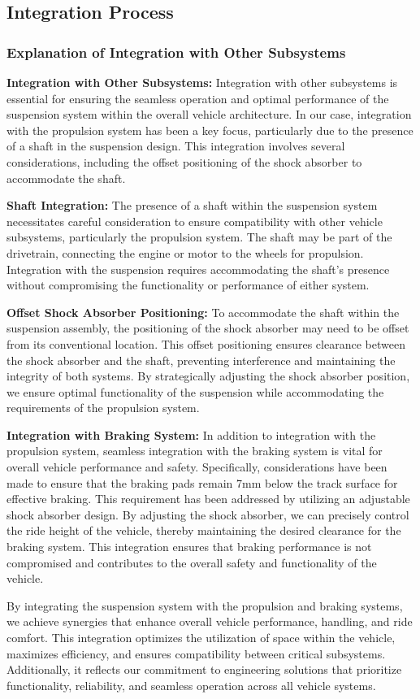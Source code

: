 \subsection{Integration Process}
\subsubsection{Explanation of Integration with Other Subsystems}
\textbf{Integration with Other Subsystems:} Integration with other subsystems is essential for ensuring the seamless operation and optimal performance of the suspension system within the overall vehicle architecture. In our case, integration with the propulsion system has been a key focus, particularly due to the presence of a shaft in the suspension design. This integration involves several considerations, including the offset positioning of the shock absorber to accommodate the shaft.

\textbf{Shaft Integration:} The presence of a shaft within the suspension system necessitates careful consideration to ensure compatibility with other vehicle subsystems, particularly the propulsion system. The shaft may be part of the drivetrain, connecting the engine or motor to the wheels for propulsion. Integration with the suspension requires accommodating the shaft's presence without compromising the functionality or performance of either system.

\textbf{Offset Shock Absorber Positioning:} To accommodate the shaft within the suspension assembly, the positioning of the shock absorber may need to be offset from its conventional location. This offset positioning ensures clearance between the shock absorber and the shaft, preventing interference and maintaining the integrity of both systems. By strategically adjusting the shock absorber position, we ensure optimal functionality of the suspension while accommodating the requirements of the propulsion system.

\textbf{Integration with Braking System:} In addition to integration with the propulsion system, seamless integration with the braking system is vital for overall vehicle performance and safety. Specifically, considerations have been made to ensure that the braking pads remain 7mm below the track surface for effective braking. This requirement has been addressed by utilizing an adjustable shock absorber design. By adjusting the shock absorber, we can precisely control the ride height of the vehicle, thereby maintaining the desired clearance for the braking system. This integration ensures that braking performance is not compromised and contributes to the overall safety and functionality of the vehicle.

By integrating the suspension system with the propulsion and braking systems, we achieve synergies that enhance overall vehicle performance, handling, and ride comfort. This integration optimizes the utilization of space within the vehicle, maximizes efficiency, and ensures compatibility between critical subsystems. Additionally, it reflects our commitment to engineering solutions that prioritize functionality, reliability, and seamless operation across all vehicle systems.

